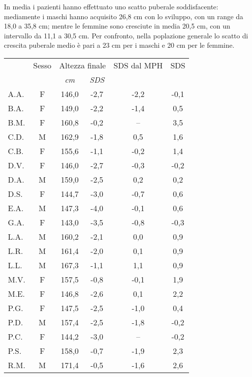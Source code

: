 In media i pazienti hanno effettuato uno scatto puberale soddisfacente: mediamente i maschi hanno acquisito 26,8 cm con lo sviluppo, con un range da 18,0 a 35,8 cm; mentre le femmine sono cresciute in media 20,5 cm, con un intervallo da 11,1 a 30,5 cm. Per confronto, nella poplazione generale lo scatto di crescita puberale medio è pari a 23 cm per i maschi e 20 cm per le femmine.  \cite{tanner1990foetus}

\begin{table}[!h]
\begin{center}
\begin{tabular}{lccccc}
\toprule
 & Sesso & \multicolumn{2}{c}{Altezza finale} 	& SDS dal MPH	& \Delta SDS \\
\cmidrule(r){3-4}
  &  & \emph{cm} 	& \emph{SDS}  	   	&		& 			 	\\
\midrule
A.A.	& F & 146,0 & -2,7  & -2,2  & -0,1    \\
B.A.	& F & 149,0 & -2,2  & -1,4  & 0,5     \\
B.M.	& F & 160,8 & -0,2  & --    & 3,5     \\
C.D.	& M & 162,9 & -1,8  & 0,5   & 1,6     \\
C.B.	& F & 155,6 & -1,1  & -0,2  & 1,4     \\
D.V.	& F & 146,0 & -2,7  & -0,3  & -0,2    \\
D.A.	& M & 159,0 & -2,5  & 0,2   & 0,2      \\
D.S.	& F & 144,7 & -3,0  & -0,7  & 0,6     \\
E.A.	& M & 147,3 & -4,0  & -0,1  & 0,6     \\
G.A.	& F & 143,0 & -3,5  & -0,8  & -0,3        \\
L.A.	& M & 160,2 & -2,1  & 0,0   & 0,9     \\
L.R.	& M & 161,4 & -2,0  & 0,1   & 0,9     \\
L.L.	& M & 167,3 & -1,1  & 1,1   & 0,9     \\
M.V.	& F & 157,5 & -0,8  & -0,1  & 1,9     \\
M.E.	& F & 146,8 & -2,6  & 0,1   & 2,2     \\
P.G.	& F & 147,5 & -2,5  & -1,0  & 0,4     \\
P.D.	& M & 157,4 & -2,5  & -1,8  & -0,2    \\
P.C.	& F & 144,2 & -3,0  & --  & -0,2   \\
P.S.	& F & 158,0 & -0,7  & -1,9  & 2,3     \\
R.M.	& M & 171,4 & -0,5  & -1,6  & 2,6    \\

\end{tabular}
\end{center}
\end{table}
